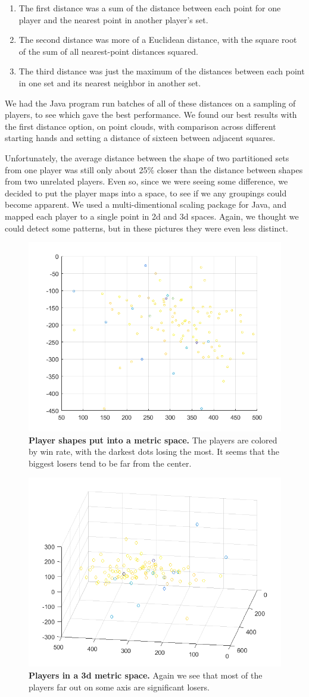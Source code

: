 \documentclass[11pt]{article}
\begin{document}
\begin{enumerate}
	\item The first distance was a sum of the distance between each point for
	one player and the nearest point in another player's set.
	\item The second distance was more of a Euclidean distance, with the square
	root of the sum of all nearest-point distances squared.
	\item The third distance was just the maximum of the distances between each
	point in one set and its nearest neighbor in another set.
\end{enumerate}

We had the Java program run batches of all of these distances on a sampling of
players, to see which gave the best performance.
We found our best results with the first distance option, on point clouds, with
comparison across different starting hands and setting a distance of sixteen
between adjacent squares.

 Unfortunately, the average distance between the shape of
two partitioned sets from one player was still only about 25\% closer than the
distance between shapes from two unrelated players. Even so, since we were seeing
some difference, we decided to put the player maps into a space, to see if we any
groupings could become apparent. We used a multi-dimentional scaling package for Java, 
and mapped each player to a single point in 2d and 3d spaces. Again, we thought
we could detect some patterns, but in these pictures they were even less distinct.

\begin{figure}[ht!]
		\includegraphics[width=.45\textwidth]{2dpart2_1.png}
  		\caption{\textbf{Player shapes put into a metric space.} The players are colored
  		by win rate, with the darkest dots losing the most. It seems that the
  		biggest losers tend to be far from the center.}
\end{figure}

\begin{figure}[ht!]
		\includegraphics[width=.45\textwidth]{3dpart2_2.png}
  		\caption{\textbf{Players in a 3d metric space.} Again we see that most of the
  		players far out on some axis are significant losers.}
\end{figure}
\end{document}
